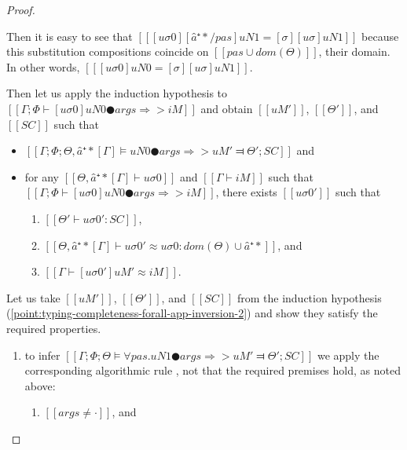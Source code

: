 \begin{proof}
\begin{caseof}
\begin{enumerate}
\begin{enumerate}
                            Then it is easy to see that $[[ [uσ0][â⁺*/pas]uN1 = [σ][uσ]uN1 ]]$
                            because this substitution compositions coincide on 
                            $[[ {pas} ∪ dom(Θ) ]]$, their domain.
                            In other words, $[[ [uσ0]uN0 = [σ][uσ]uN1 ]]$.

                            Then let us apply the induction hypothesis
                            to $[[Γ; Φ ⊢ [uσ0]uN0 ● args ⇒> iM]]$ and obtain 
                            $[[uM']]$, $[[Θ']]$, and $[[SC]]$ such that
                            \begin{itemize}
                                \item $[[ Γ; Φ; Θ, â⁺*[Γ] ⊨ uN0 ● args ⇒> uM' ⫤ Θ'; SC ]]$ and
                                \item \label{point:typing-completeness-forall-app-inversion-3}
                                for any $[[Θ, â⁺*[Γ]  ⊢ uσ0]]$ and $[[Γ ⊢ iM]]$
                                    such that $[[Γ; Φ ⊢ [uσ0]uN0 ● args ⇒> iM]]$, 
                                    there exists $[[uσ0']]$ such that 
                                \begin{enumerate}
                                    \item $[[Θ' ⊢ uσ0' : SC]]$,
                                    \item $[[Θ, â⁺*[Γ] ⊢ uσ0' ≈ uσ0 : dom(Θ) ∪ {â⁺*}]]$, and 
                                    \item $[[Γ ⊢ [uσ0']uM' ≈ iM]]$.
                                \end{enumerate}
                            \end{itemize}
                    \end{enumerate}
            \end{enumerate}
            Let us take $[[uM']]$, $[[Θ']]$, and $[[SC]]$ from the induction hypothesis
            (\ref{point:typing-completeness-forall-app-inversion-2}) and show they 
            satisfy the required properties.
            \begin{enumerate}
                \item to infer $[[ Γ; Φ; Θ ⊨ ∀pas.uN1 ● args ⇒> uM' ⫤ Θ'; SC ]]$
                    we apply the corresponding algorithmic rule ,
                    not that the required premises hold, as noted above:
                    \begin{enumerate}
                        \item $[[args ≠ ·]]$, and 

\end{enumerate}
\end{enumerate}
\end{caseof}
\end{proof}
